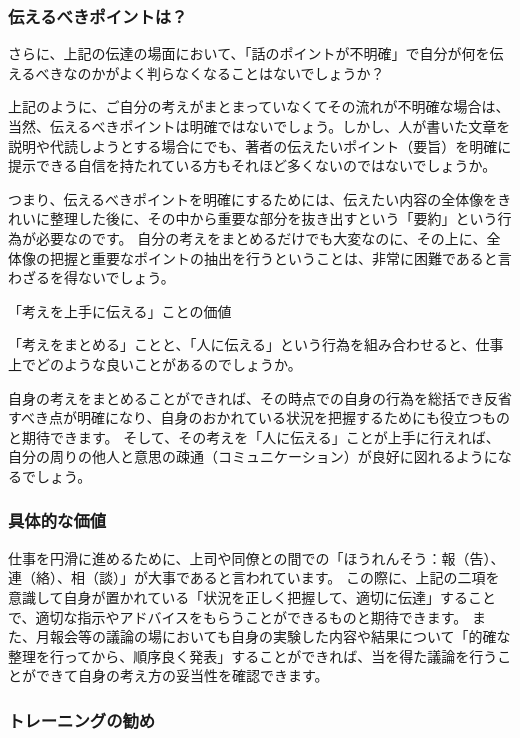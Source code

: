 \documentclass[12pt,a4paper]{jsarticle}
\makeatletter
\def\subsection{\@startsection 
{subsection}
{1}
{\z@}
{3.5ex plus -1ex minus -.2ex}
{1.ex plus .2ex}
{\large\bf}
}
\makeatother
\begin{document}
\subsubsection{伝えるべきポイントは？}
さらに、上記の伝達の場面において、「話のポイントが不明確」で自分が何を伝えるべきなのかがよく判らなくなることはないでしょうか？

上記のように、ご自分の考えがまとまっていなくてその流れが不明確な場合は、当然、伝えるべきポイントは明確ではないでしょう。しかし、人が書いた文章を説明や代読しようとする場合にでも、著者の伝えたいポイント（要旨）を明確に提示できる自信を持たれている方もそれほど多くないのではないでしょうか。

つまり、伝えるべきポイントを明確にするためには、伝えたい内容の全体像をきれいに整理した後に、その中から重要な部分を抜き出すという「要約」という行為が必要なのです。
自分の考えをまとめるだけでも大変なのに、その上に、全体像の把握と重要なポイントの抽出を行うということは、非常に困難であると言わざるを得ないでしょう。

\subsection{「考えを上手に伝える」ことの価値}

「考えをまとめる」ことと、「人に伝える」という行為を組み合わせると、仕事上でどのような良いことがあるのでしょうか。

自身の考えをまとめることができれば、その時点での自身の行為を総括でき反省すべき点が明確になり、自身のおかれている状況を把握するためにも役立つものと期待できます。
そして、その考えを「人に伝える」ことが上手に行えれば、自分の周りの他人と意思の疎通（コミュニケーション）が良好に図れるようになるでしょう。

\subsubsection{具体的な価値}

仕事を円滑に進めるために、上司や同僚との間での「ほうれんそう：報（告）、連（絡）、相（談）」が大事であると言われています。
この際に、上記の二項を意識して自身が置かれている「状況を正しく把握して、適切に伝達」することで、適切な指示やアドバイスをもらうことができるものと期待できます。
また、月報会等の議論の場においても自身の実験した内容や結果について「的確な整理を行ってから、順序良く発表」することができれば、当を得た議論を行うことができて自身の考え方の妥当性を確認できます。

\subsubsection{トレーニングの勧め}
\end{document}
